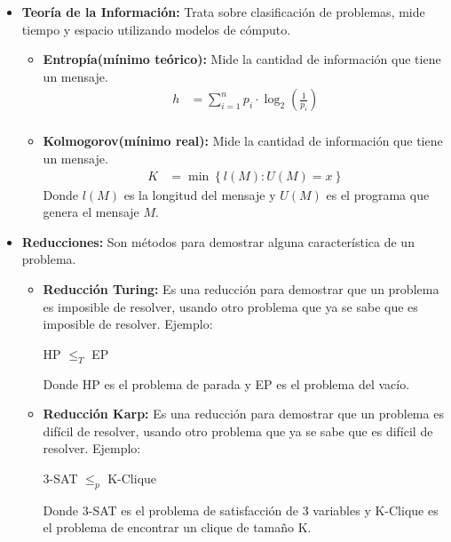 \documentclass{templateNote}
\begin{document}
\begin{itemize}
\begin{itemize}
        \item \textbf{Teoría de la Información:} Trata sobre clasificación de problemas, mide tiempo y espacio utilizando modelos de cómputo.
        \begin{itemize}
            \item \textbf{Entropía(mínimo teórico):} Mide la cantidad de información que tiene un mensaje.
            \begin{align*}
                h &=  \sum_{i=1}^{n} p_i \cdot \log_2 \left( \frac{1}{p_i} \right) \\
            \end{align*}

            \item \textbf{Kolmogorov(mínimo real):} Mide la cantidad de información que tiene un mensaje.
            \begin{align*}
                K &= \min \left\{ l(M) : U(M) = x \right\}
            \end{align*}
            Donde $l(M)$ es la longitud del mensaje y $U(M)$ es el programa que genera el mensaje $M$.
        \end{itemize}

        \item \textbf{Reducciones:} Son métodos para demostrar alguna característica de un problema.
        \begin{itemize}
            \item \textbf{Reducción Turing:} Es una reducción para demostrar que un problema es imposible de resolver, usando otro problema que ya se sabe que es imposible de resolver.
            Ejemplo:

            \begin{center}
                HP $\leq_T$ EP
            \end{center}
            Donde HP es el problema de parada y EP es el problema del vacío.
            \\
            \item \textbf{Reducción Karp:} Es una reducción para demostrar que un problema es difícil de resolver, usando otro problema que ya se sabe que es difícil de resolver.
            Ejemplo:

            \begin{center}
                3-SAT $\leq_p$ K-Clique
            \end{center}
            Donde 3-SAT es el problema de satisfacción de 3 variables y K-Clique es el problema de encontrar un clique de tamaño K.
            \\
        \end{itemize}
    \end{itemize}
    

\end{itemize}
\end{document}
